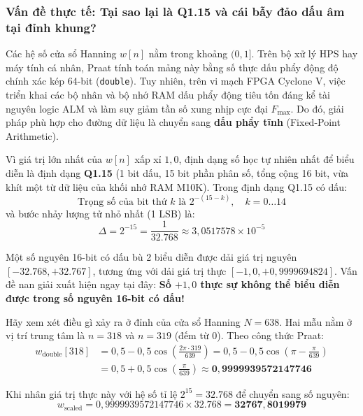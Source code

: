 \subsubsection*{Vấn đề thực tế: Tại sao lại là Q1.15 và cái bẫy đảo dấu âm tại đỉnh khung?}
Các hệ số cửa sổ Hanning $w[n]$ nằm trong khoảng $(0, 1]$. Trên bộ xử lý HPS hay máy tính cá nhân, Praat tính toán mảng này bằng số thực dấu phẩy động độ chính xác kép 64-bit (\texttt{double}). Tuy nhiên, trên vi mạch FPGA Cyclone V, việc triển khai các bộ nhân và bộ nhớ RAM dấu phẩy động tiêu tốn đáng kể tài nguyên logic ALM và làm suy giảm tần số xung nhịp cực đại $F_{\max}$. Do đó, giải pháp phù hợp cho đường dữ liệu là chuyển sang \textbf{dấu phẩy tĩnh} (Fixed-Point Arithmetic).

Vì giá trị lớn nhất của $w[n]$ xấp xỉ $1{,}0$, định dạng số học tự nhiên nhất để biểu diễn là định dạng \textbf{Q1.15} (1 bit dấu, 15 bit phần phân số, tổng cộng 16 bit, vừa khít một từ dữ liệu của khối nhớ RAM M10K). Trong định dạng Q1.15 có dấu:
\begin{equation}
\text{Trọng số của bit thứ } k \text{ là } 2^{-(15-k)}, \quad k = 0 \dots 14
\end{equation}
và bước nhảy lượng tử nhỏ nhất (1 LSB) là:
\begin{equation}
\Delta = 2^{-15} = \frac{1}{32.768} \approx 3{,}0517578 \times 10^{-5}
\end{equation}

Một số nguyên 16-bit có dấu bù 2 biểu diễn được dải giá trị nguyên $[-32.768, +32.767]$, tương ứng với dải giá trị thực $[-1{,}0, +0{,}9999694824]$. Vấn đề nan giải xuất hiện ngay tại đây: \textbf{Số $+1{,}0$ thực sự không thể biểu diễn được trong số nguyên 16-bit có dấu!}

Hãy xem xét điều gì xảy ra ở đỉnh của cửa sổ Hanning $N = 638$. Hai mẫu nằm ở vị trí trung tâm là $n = 318$ và $n = 319$ (đếm từ $0$). Theo công thức Praat:
\begin{align}
w_{\text{double}}[318] &= 0{,}5 - 0{,}5 \cos\left( \frac{2\pi \cdot 319}{639} \right) = 0{,}5 - 0{,}5 \cos\left( \pi - \frac{\pi}{639} \right) \nonumber \\
&= 0{,}5 + 0{,}5 \cos\left( \frac{\pi}{639} \right) \approx \mathbf{0{,}9999939572147746}
\end{align}

Khi nhân giá trị thực này với hệ số tỉ lệ $2^{15} = 32.768$ để chuyển sang số nguyên:
\begin{equation}
w_{\text{scaled}} = 0{,}9999939572147746 \times 32.768 = \mathbf{32767{,}8019979}
\end{equation}

